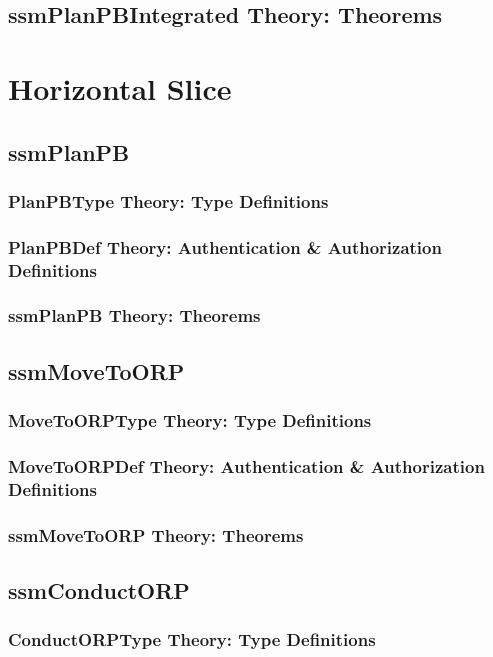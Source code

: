 \documentclass[hidelinks,12pt,a4paper]{report}
\begin{document}
\begin{appendices}
\subsection{ssmPlanPBIntegrated Theory: Theorems}



\section{Horizontal Slice}
\subsection{ssmPlanPB}
\subsubsection{PlanPBType Theory: Type Definitions}
\subsubsection{PlanPBDef Theory: Authentication \& Authorization Definitions}
\subsubsection{ssmPlanPB Theory: Theorems}

\subsection{ssmMoveToORP}
\subsubsection{MoveToORPType Theory: Type Definitions}
\subsubsection{MoveToORPDef Theory: Authentication \& Authorization Definitions}
\subsubsection{ssmMoveToORP Theory: Theorems}

\subsection{ssmConductORP}
\subsubsection{ConductORPType Theory: Type Definitions}

\end{appendices}
\end{document}
